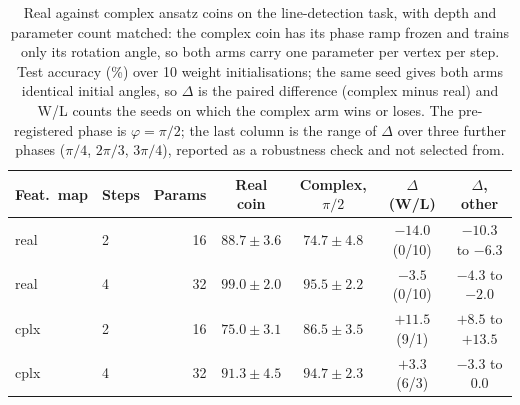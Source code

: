 \begin{table}[htbp]
\centering
\caption[Real against complex coins at matched depth and parameter count]{Real against complex ansatz coins on the line-detection task, with depth and parameter count matched: the complex coin has its phase ramp frozen and trains only its rotation angle, so both arms carry one parameter per vertex per step. Test accuracy (\%) over 10 weight initialisations; the same seed gives both arms identical initial angles, so $\Delta$ is the paired difference (complex minus real) and W/L counts the seeds on which the complex arm wins or loses. The pre-registered phase is $\varphi = \pi/2$; the last column is the range of $\Delta$ over three further phases ($\pi/4$, $2\pi/3$, $3\pi/4$), reported as a robustness check and not selected from.}
\label{tab:qnnmatched}
\small
\begin{tabular}{llrcccc}
\hline
Feat.\ map & Steps & Params & Real coin & Complex, $\pi/2$ & $\Delta$ (W/L) & $\Delta$, other \\
\hline
real & 2 & 16 & $88.7 \pm 3.6$ & $74.7 \pm 4.8$ & $-14.0$ (0/10) & $-10.3$ to $-6.3$ \\
real & 4 & 32 & $99.0 \pm 2.0$ & $95.5 \pm 2.2$ & $-3.5$ (0/10) & $-4.3$ to $-2.0$ \\
cplx & 2 & 16 & $75.0 \pm 3.1$ & $86.5 \pm 3.5$ & $+11.5$ (9/1) & $+8.5$ to $+13.5$ \\
cplx & 4 & 32 & $91.3 \pm 4.5$ & $94.7 \pm 2.3$ & $+3.3$ (6/3) & $-3.3$ to $0.0$ \\
\hline
\end{tabular}
\end{table}
